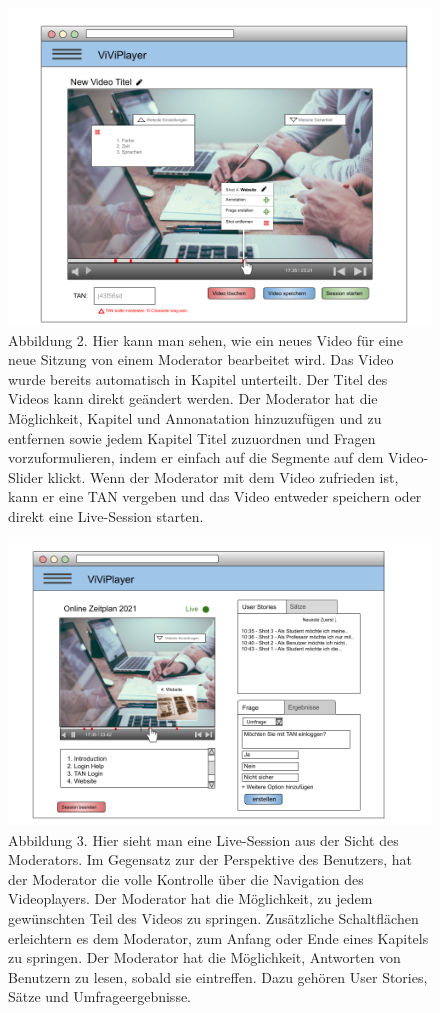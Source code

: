 \begin{figure}
  \includegraphics[width=\linewidth]{5dot2.png}
  \caption{Abbildung 2. Hier kann man sehen, wie ein neues Video für eine neue Sitzung von einem Moderator bearbeitet wird. Das Video wurde bereits automatisch in Kapitel unterteilt. Der Titel des Videos kann direkt geändert werden. Der Moderator hat die Möglichkeit, Kapitel und Annonatation hinzuzufügen und zu entfernen sowie jedem Kapitel Titel zuzuordnen und Fragen vorzuformulieren, indem er einfach auf die Segmente auf dem Video-Slider klickt. Wenn der Moderator mit dem Video zufrieden ist, kann er eine TAN vergeben und das Video entweder speichern oder direkt eine Live-Session starten.}
  \label{fig:5dot2}
\end{figure}

\begin{figure}
  \includegraphics[width=\linewidth]{5dot3.png}
  \caption{Abbildung 3. Hier sieht man eine Live-Session aus der Sicht des Moderators. Im Gegensatz zur der Perspektive des Benutzers, hat der Moderator die volle Kontrolle über die Navigation des Videoplayers. Der Moderator hat die Möglichkeit, zu jedem gewünschten Teil des Videos zu springen. Zusätzliche Schaltflächen erleichtern es dem Moderator, zum Anfang oder Ende eines Kapitels zu springen. Der Moderator hat die Möglichkeit, Antworten von Benutzern zu lesen, sobald sie eintreffen. Dazu gehören User Stories, Sätze und Umfrageergebnisse.}
  \label{fig:5dot3}
\end{figure}

